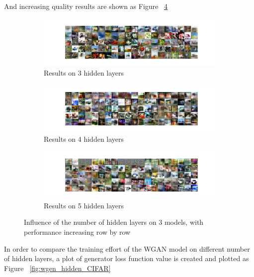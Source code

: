 \documentclass[12pt,letterpaper]{article}
\begin{document}
And increasing quality results are shown as Figure ~\ref{fig:CIFAR_WGAN_hidden}

\begin{figure}[h]
    \begin{subfigure}{0.495\textwidth}
    \includegraphics[width=\linewidth]{WGAN_CIFAR_0_50_256.png}
    \caption{\small Results on 3 hidden layers} \label{fig:a}
    \end{subfigure}\hspace*{\fill}
    \begin{subfigure}{0.495\textwidth}
    \includegraphics[width=\linewidth]{WGAN_CIFAR_1_50_256.png}
    \caption{\small Results on 4 hidden layers} \label{fig:b}
    \end{subfigure}

    \medskip
    \begin{subfigure}{0.495\textwidth}
    \includegraphics[width=\linewidth]{WGAN_CIFAR_2_50_256.png}
    \caption{\small Results on 5 hidden layers} \label{fig:c}
    \end{subfigure}\hspace*{\fill}
    \caption{Influence of the number of hidden layers on $3$ models, with performance increasing row by row} \label{fig:CIFAR_WGAN_hidden}
\end{figure}

In order to compare the training effort of the WGAN model on different number of hidden layers, a plot of generator loss function value is created and plotted as Figure ~\ref{fig:wgen_hidden_CIFAR}
\end{document}
